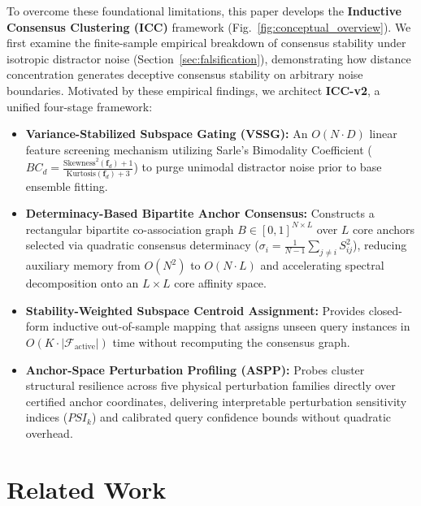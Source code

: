 \documentclass[10pt,conference]{IEEEtran}
\begin{document}
To overcome these foundational limitations, this paper develops the \textbf{Inductive Consensus Clustering (ICC)} framework (Fig.~\ref{fig:conceptual_overview}). We first examine the finite-sample empirical breakdown of consensus stability under isotropic distractor noise (Section~\ref{sec:falsification}), demonstrating how distance concentration generates deceptive consensus stability on arbitrary noise boundaries. Motivated by these empirical findings, we architect \textbf{ICC-v2}, a unified four-stage framework:
\begin{itemize}
    \item \textbf{Variance-Stabilized Subspace Gating (VSSG):} An $O(N \cdot D)$ linear feature screening mechanism utilizing Sarle's Bimodality Coefficient ($BC_d = \frac{\mathrm{Skewness}^2(\mathbf{f}_d) + 1}{\mathrm{Kurtosis}(\mathbf{f}_d) + 3}$) to purge unimodal distractor noise prior to base ensemble fitting.
    \item \textbf{Determinacy-Based Bipartite Anchor Consensus:} Constructs a rectangular bipartite co-association graph $B \in [0, 1]^{N \times L}$ over $L$ core anchors selected via quadratic consensus determinacy ($\sigma_i = \frac{1}{N-1}\sum_{j \neq i} S_{ij}^2$), reducing auxiliary memory from $O(N^2)$ to $O(N \cdot L)$ and accelerating spectral decomposition onto an $L \times L$ core affinity space.
    \item \textbf{Stability-Weighted Subspace Centroid Assignment:} Provides closed-form inductive out-of-sample mapping that assigns unseen query instances in $O(K \cdot |\mathcal{F}_{\text{active}}|)$ time without recomputing the consensus graph.
    \item \textbf{Anchor-Space Perturbation Profiling (ASPP):} Probes cluster structural resilience across five physical perturbation families directly over certified anchor coordinates, delivering interpretable perturbation sensitivity indices ($PSI_k$) and calibrated query confidence bounds without quadratic overhead.
\end{itemize}


\section{Related Work}\label{sec:related}
\end{document}
